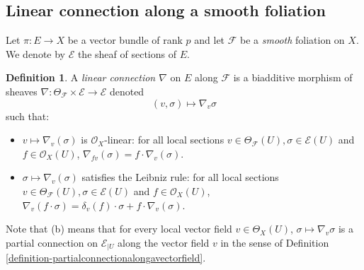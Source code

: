 \documentclass[12pt]{amsart}
\theoremstyle{definition}
\newtheorem{definition}{Definition}[subsection]
\theoremstyle{plain}
\theoremstyle{exampstyle}
\theoremstyle{exampstyle}\newtheorem{thmxbis}{Theorem}
\numberwithin{equation}{section}
\theoremstyle{remark}
\begin{document}
\subsection{Linear connection along a smooth foliation} Let $\pi: E \rightarrow X$ be a vector bundle of rank $p$ and let $\mathcal F$ be a {\em smooth} foliation on $X$. We denote by $\mathcal E$ the sheaf of sections of $E$.

\begin{definition} \label{definition-connectionalongafoliation}
A {\em linear connection $\nabla$} on $E$ along $\mathcal F$ is a biadditive morphism of sheaves  
$\nabla : \Theta_\mathcal F \times \mathcal E \rightarrow \mathcal E$
denoted $$(v,\sigma) \mapsto \nabla_v \sigma$$ such that: 
\begin{itemize} 
\item[(a)] $v \mapsto \nabla_v(\sigma)$ is $\mathcal O_X$-linear: for all local sections $v \in \Theta_{\mathcal F}(U), \sigma \in \mathcal E(U)$ and $f \in \mathcal O_X(U)$, 
$\nabla_{fv}(\sigma) = f \cdot \nabla_v(\sigma)$.
\item[(b)] $\sigma \mapsto \nabla_v(\sigma)$ satisfies the Leibniz rule: for all local sections $v \in \Theta_{\mathcal F}(U), \sigma \in \mathcal E(U)$ and $f \in \mathcal O_X(U)$, 
$\nabla_v(f \cdot \sigma) = \delta_v(f) \cdot \sigma + f \cdot \nabla_v(\sigma)$.
\end{itemize} 
Note that (b) means that for every local vector field $v \in \Theta_X(U)$, $\sigma \mapsto \nabla_v \sigma$ is a partial connection on $\mathcal E_{\mid U}$ along the vector field $v$ in the sense of Definition \ref{definition-partialconnectionalongavectorfield}. 
\end{definition} 
\end{document}
